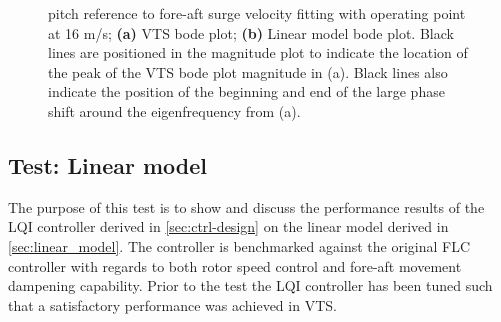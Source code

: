 \begin{figure}[ht]
	\centering
	
	\hfil
	
	\caption{pitch reference to fore-aft surge velocity fitting with operating point at 16 m/s; \textbf{(a)} VTS bode plot; \textbf{(b)} Linear model bode plot. Black lines are positioned in the magnitude plot to indicate the location of the peak of the VTS bode plot magnitude in (a). Black lines also indicate the position of the beginning and end of the large phase shift around the eigenfrequency from (a).}
	\label{fig:app_th-vy_16}
\end{figure}



%	
%	


\subsection{Test: Linear model} \label{sec:app_test_lin}
The purpose of this test is to show and discuss the performance results of the LQI controller derived in \cref{sec:ctrl-design} on the linear model derived in \cref{sec:linear_model}. The controller is benchmarked against the original FLC controller with regards to both rotor speed control and fore-aft movement dampening capability. Prior to the test the LQI controller has been tuned such that a satisfactory performance was achieved in VTS.


